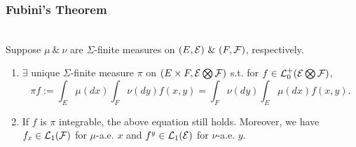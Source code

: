 \vspace{12pt}
\subsubsection{Fubini's Theorem}
\begin{theorem}\ \\
Suppose $\mu\ \&\ \nu$ are $\Sigma$-finite measures on $(E,\mathcal{E})\ \&\ (F,\mathcal{F})$, respectively.
\begin{enumerate}[label = (\arabic*)]
    \item $\exists$ unique $\Sigma$-finite measure $\pi$ on $(E \times F, \mathcal{E} \bigotimes \mathcal{F})$ s.t. for $f \in \mathcal{L}_0^+(\mathcal{E} \bigotimes \mathcal{F})$,
    \begin{equation*}
        \pi f := \int_E \mu(dx) \int_F \nu(dy) f(x,y) = \int_F \nu(dy) \int_E \mu(dx) f(x,y).
    \end{equation*}
    \item If $f$ is $\pi$ integrable, the above equation still holds. Moreover, we have
    $f_x \in \mathcal{L}_1(\mathcal{F})$ for $\mu$-a.e. $x$ and $f^y \in \mathcal{L}_1(\mathcal{E})$ for $\nu$-a.e. $y$.
\end{enumerate}
\end{theorem}
